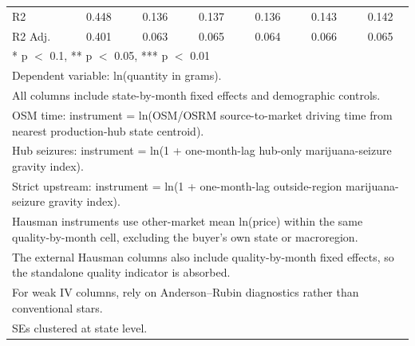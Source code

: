 \begin{table}[H]
{\begin{tabular}[t]{lcccccc}
R2 & 0.448 & 0.136 & 0.137 & 0.136 & 0.143 & 0.142\\
R2 Adj. & 0.401 & 0.063 & 0.065 & 0.064 & 0.066 & 0.065\\
\bottomrule
\multicolumn{7}{l}{\rule{0pt}{1em}* p $<$ 0.1, ** p $<$ 0.05, *** p $<$ 0.01}\\
\multicolumn{7}{l}{\rule{0pt}{1em}Dependent variable: ln(quantity in grams).}\\
\multicolumn{7}{l}{\rule{0pt}{1em}All columns include state-by-month fixed effects and demographic controls.}\\
\multicolumn{7}{l}{\rule{0pt}{1em}OSM time: instrument = ln(OSM/OSRM source-to-market driving time from nearest production-hub state centroid).}\\
\multicolumn{7}{l}{\rule{0pt}{1em}Hub seizures: instrument = ln(1 + one-month-lag hub-only marijuana-seizure gravity index).}\\
\multicolumn{7}{l}{\rule{0pt}{1em}Strict upstream: instrument = ln(1 + one-month-lag outside-region marijuana-seizure gravity index).}\\
\multicolumn{7}{l}{\rule{0pt}{1em}Hausman instruments use other-market mean ln(price) within the same quality-by-month cell, excluding the buyer's own state or macroregion.}\\
\multicolumn{7}{l}{\rule{0pt}{1em}The external Hausman columns also include quality-by-month fixed effects, so the standalone quality indicator is absorbed.}\\
\multicolumn{7}{l}{\rule{0pt}{1em}For weak IV columns, rely on Anderson--Rubin diagnostics rather than conventional stars.}\\
\multicolumn{7}{l}{\rule{0pt}{1em}SEs clustered at state level.}\\
\end{tabular}
}
\end{table}
